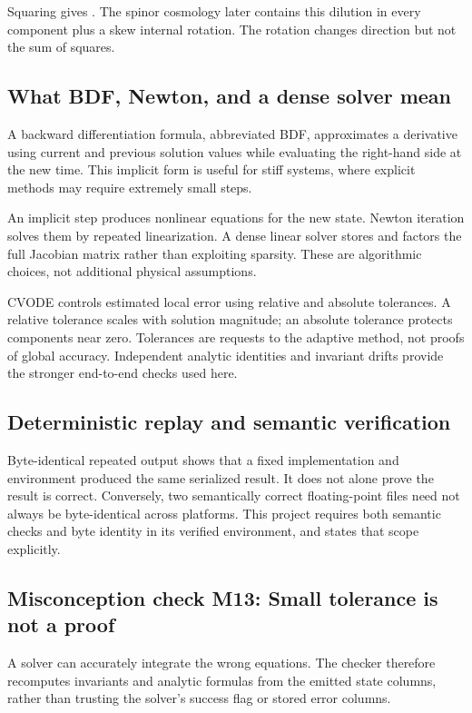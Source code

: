 \documentclass[11pt]{article}
\begin{document}
Squaring gives \texttt{}. The spinor cosmology later contains this dilution in every component plus a skew internal rotation. The rotation changes direction but not the sum of squares.

\subsection{What BDF, Newton, and a dense solver mean}

A backward differentiation formula, abbreviated BDF, approximates a derivative using current and previous solution values while evaluating the right-hand side at the new time. This implicit form is useful for stiff systems, where explicit methods may require extremely small steps.

An implicit step produces nonlinear equations for the new state. Newton iteration solves them by repeated linearization. A dense linear solver stores and factors the full Jacobian matrix rather than exploiting sparsity. These are algorithmic choices, not additional physical assumptions.

CVODE controls estimated local error using relative and absolute tolerances. A relative tolerance scales with solution magnitude; an absolute tolerance protects components near zero. Tolerances are requests to the adaptive method, not proofs of global accuracy. Independent analytic identities and invariant drifts provide the stronger end-to-end checks used here.

\subsection{Deterministic replay and semantic verification}

Byte-identical repeated output shows that a fixed implementation and environment produced the same serialized result. It does not alone prove the result is correct. Conversely, two semantically correct floating-point files need not always be byte-identical across platforms. This project requires both semantic checks and byte identity in its verified environment, and states that scope explicitly.

\subsection{Misconception check M13: Small tolerance is not a proof}

A solver can accurately integrate the wrong equations. The checker therefore recomputes invariants and analytic formulas from the emitted state columns, rather than trusting the solver's success flag or stored error columns.
\end{document}
